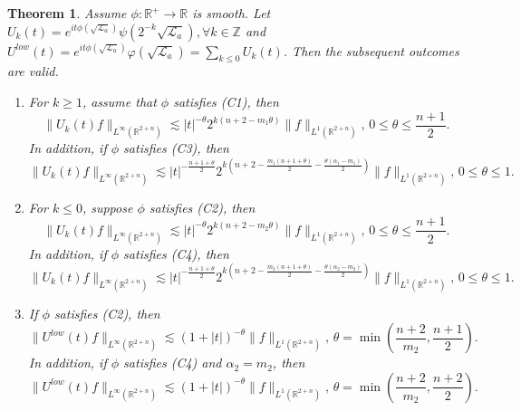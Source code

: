 \documentclass[10pt,a4paper]{amsart}
\newtheorem{theorem}{Theorem}
\begin{document}
\begin{theorem}\label{ResultTime}
	Assume $\phi:\mathbb{R}^+ \to \mathbb{R}$ is smooth. Let  $U_k(t)=e^{it\phi(\sqrt{\mathcal{L}_a})}\psi(2^{-k}\sqrt{\mathcal{L}_a}), \forall k\in\mathbb{Z}$ and $U^{low}(t)=e^{it\phi(\sqrt{\mathcal{L}_a})}\varphi(\sqrt{\mathcal{L}_a})=\sum\limits_{k\leq0} U_k(t)$.   Then the subsequent outcomes are valid.
 \begin{enumerate}
 \item[\textbf{(A)}]   For $k \geq 1$, assume that $\phi$ satisfies (C1), then
	\begin{equation*}\label{res3-2}
	\|U_k(t) f\|_{L^\infty(\mathbb{R}^{2+n})} \lesssim |t|^{-\theta}2^{k\left(n+2-m_1\theta\right)}\|f\|_{L^1(\mathbb{R}^{2+n})},\,0 \leq \theta \leq \frac{n+1}{2}.
	\end{equation*}
 In addition, if $\phi$ satisfies (C3), then
	\begin{equation*}\label{res3-3}
	\|U_k(t) f\|_{L^\infty(\mathbb{R}^{2+n})} \lesssim |t|^{-\frac{n+1+\theta}{2}}2^{k\left(n+2-\frac{m_1(n+1+\theta)}{2}-\frac{\theta(\alpha_1-m_1)}{2}\right)}\|f\|_{L^1(\mathbb{R}^{2+n})},\,   0 \leq \theta \leq 1.
	\end{equation*}
 \item[\textbf{(B)}] For $k\leq 0$, suppose $\phi$ satisfies (C2), then
	\begin{equation*}
	\|U_k(t) f\|_{L^\infty(\mathbb{R}^{2+n})} \lesssim |t|^{-\theta}2^{k\left(n+2-m_2\theta\right)}\|f\|_{L^1(\mathbb{R}^{2+n})},\,0 \leq \theta \leq \frac{n+1}{2}.
	\end{equation*}
In addition, if $\phi$ satisfies (C4), then
	\begin{equation*}
	\|U_k(t) f\|_{L^\infty(\mathbb{R}^{2+n})} \lesssim |t|^{-\frac{n+1+\theta}{2}}2^{k\left(n+2-\frac{m_2(n+1+\theta)}{2}-\frac{\theta(\alpha_2-m_2)}{2}\right)}\|f\|_{L^1(\mathbb{R}^{2+n})},\,   0 \leq \theta \leq 1.
	\end{equation*}
\item[\textbf{(C)}] If $\phi$ satisfies (C2), then
	\begin{equation}\label{res-sum1}
 \|U^{low}(t) f\|_{L^\infty(\mathbb{R}^{2+n})} \lesssim (1+|t|)^{-\theta}\|f\|_{L^1(\mathbb{R}^{2+n})},\,\theta=\min\left(\frac{n+2}{m_2},\frac{n+1}{2}\right).
	\end{equation}
In addition, if $\phi$ satisfies (C4) and $\alpha_2=m_2$, then
	\begin{equation}\label{res-sum2}
	\|U^{low}(t) f\|_{L^\infty(\mathbb{R}^{2+n})}  \lesssim (1+|t|)^{-\theta}\|f\|_{L^1(\mathbb{R}^{2+n})},\,\theta=\min\left(\frac{n+2}{m_2},\frac{n+2}{2}\right).
	\end{equation}
	 \end{enumerate}
\end{theorem}
\end{document}
